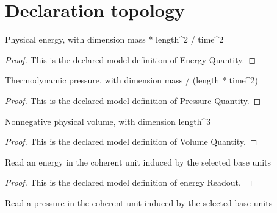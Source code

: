 \section{Declaration topology}
\begin{definition}
  \label{def:physics:phyx-mini-0341:phyxminiproblems-problemphyxmini0341-energyquantity}
  Physical energy, with dimension mass * length\textasciicircum{}2 / time\textasciicircum{}2
\end{definition}
\begin{proof}
  This is the declared model definition of Energy Quantity.
\end{proof}
\begin{definition}
  \label{def:physics:phyx-mini-0341:phyxminiproblems-problemphyxmini0341-pressurequantity}
  Thermodynamic pressure, with dimension mass / (length * time\textasciicircum{}2)
\end{definition}
\begin{proof}
  This is the declared model definition of Pressure Quantity.
\end{proof}
\begin{definition}
  \label{def:physics:phyx-mini-0341:phyxminiproblems-problemphyxmini0341-volumequantity}
  Nonnegative physical volume, with dimension length\textasciicircum{}3
\end{definition}
\begin{proof}
  This is the declared model definition of Volume Quantity.
\end{proof}
\begin{definition}
  \label{def:physics:phyx-mini-0341:phyxminiproblems-problemphyxmini0341-energyreadout}
  Read an energy in the coherent unit induced by the selected base units
\end{definition}
\begin{proof}
  This is the declared model definition of energy Readout.
\end{proof}
\begin{definition}
  \label{def:physics:phyx-mini-0341:phyxminiproblems-problemphyxmini0341-pressurereadout}
  Read a pressure in the coherent unit induced by the selected base units
\end{definition}
